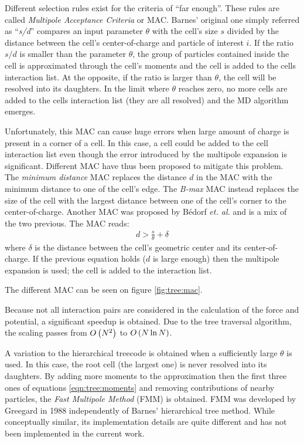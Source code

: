 Different selection rules exist for the criteria of ``far enough''. These
rules are called \textit{Multipole Acceptance Criteria} or
MAC\cite{Pfalzner1996}. Barnes' original one simply referred as
``\textit{s/d}'' compares an input parameter $\theta$ with the cell's size $s$
divided by the distance between the cell's center-of-charge and particle of
interest $i$. If the ratio $s/d$ is smaller than the parameter $\theta$, the
group of particles contained inside the cell is approximated through the cell's
moments and the cell is added to the cells interaction list. At the opposite, if
the ratio is larger than $\theta$, the cell will be resolved into its daughters.
In the limit where $\theta$ reaches zero, no more cells are added to the
cells interaction list (they are all resolved) and the MD algorithm emerges.

Unfortunately, this MAC can cause huge errors when large amount of charge is
present in a corner of a cell. In this case, a cell could be added to the cell
interaction list even though the error introduced by the multipole expansion is
significant. Different MAC have thus been proposed to mitigate this problem.
The \textit{minimum distance} MAC replaces the distance $d$ in the MAC with the
minimum distance to one of the cell's edge. The \textit{B-max} MAC instead
replaces the size of the cell with the largest distance between one of the
cell's corner to the center-of-charge. Another MAC was proposed by Bédorf
\textit{et. al.} \cite{Bedorf2012} and is a mix of the two previous. The MAC
reads:
\begin{align}
d > \frac{s}{\theta} + \delta
\end{align}
where $\delta$ is the distance between the cell's geometric center and its
center-of-charge. If the previous equation holds ($d$ is large enough) then the
multipole expansion is used; the cell is added to the interaction list.

The different MAC can be seen on figure \ref{fig:tree:mac}.


Because not all interaction pairs are considered in the calculation of the
force and potential, a significant speedup is obtained. Due to the tree
traversal algorithm, the scaling passes\cite{Barnes1986,Gibbon2002,Pfalzner1996}
from $O\left( N^2 \right)$ to $O\left( N \ln{N} \right)$.

A variation to the hierarchical treecode is obtained when a sufficiently large
$\theta$ is used. In this case, the root cell (the largest one) is never
resolved into its daughters. By adding more moments to the approximation then
the first three ones of equations \eqref{eqn:tree:moments} and removing
contributions of nearby particles, the \textit{Fast Multipole Method} (FMM) is
obtained\cite{Pfalzner1996}. FMM was developed by Greegard in
1988\cite{Greengard1987} independently of Barnes' hierarchical tree method.
While conceptually similar, its implementation details are quite different and
has not been implemented in the current work.

